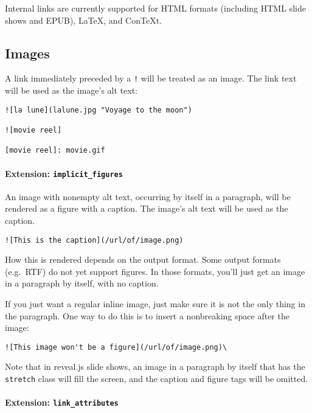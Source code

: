 \documentclass[]{article}
\begin{document}
Internal links are currently supported for HTML formats (including HTML
slide shows and EPUB), LaTeX, and ConTeXt.

\hypertarget{images}{%
\subsection{Images}\label{images}}

A link immediately preceded by a \texttt{!} will be treated as an image.
The link text will be used as the image's alt text:

\begin{verbatim}
![la lune](lalune.jpg "Voyage to the moon")

![movie reel]

[movie reel]: movie.gif
\end{verbatim}

\hypertarget{extension-implicit_figures}{%
\paragraph{\texorpdfstring{Extension:
\texttt{implicit\_figures}}{Extension: implicit\_figures}}\label{extension-implicit_figures}}

An image with nonempty alt text, occurring by itself in a paragraph,
will be rendered as a figure with a caption. The image's alt text will
be used as the caption.

\begin{verbatim}
![This is the caption](/url/of/image.png)
\end{verbatim}

How this is rendered depends on the output format. Some output formats
(e.g.~RTF) do not yet support figures. In those formats, you'll just get
an image in a paragraph by itself, with no caption.

If you just want a regular inline image, just make sure it is not the
only thing in the paragraph. One way to do this is to insert a
nonbreaking space after the image:

\begin{verbatim}
![This image won't be a figure](/url/of/image.png)\
\end{verbatim}

Note that in reveal.js slide shows, an image in a paragraph by itself
that has the \texttt{stretch} class will fill the screen, and the
caption and figure tags will be omitted.

\hypertarget{extension-link_attributes}{%
\paragraph{\texorpdfstring{Extension:
\texttt{link\_attributes}}{Extension: link\_attributes}}\label{extension-link_attributes}}
\end{document}
